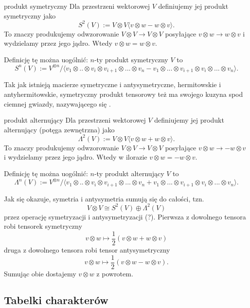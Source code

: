 \begin{definition}{produkt symetryczny}{}
  Dla przestrzeni wektorowej $V$ definiujemy jej produkt symetryczny jako
  $$S^2(V):=V\otimes V\langle v\otimes w-w\otimes v\rangle.$$
  To znaczy produkujemy odwzorowanie $V\otimes V\to V\otimes V$ posyłające $v\otimes w\to w\otimes v$ i wydzielamy przez jego jądro. Wtedy $v\otimes w=w\otimes v$.
  \bigskip
  
  Definicję tę można uogólnić: $n$-ty produkt symetryczny $V$ to
  $$S^n(V):=V^{\otimes n}/\langle v_1\otimes..\otimes v_i\otimes v_{i+1}\otimes...\otimes v_n-v_1\otimes...\otimes v_{i+1}\otimes v_i\otimes ... \otimes v_n\rangle.$$
\end{definition}

Tak jak istnieją macierze symetryczne i antysymetryczne, hermitowskie i antyhermitowskie, symetryczny produkt tensorowy też ma swojego kuzyna spod ciemnej gwiazdy, nazywającego się .

\begin{definition}{produkt alternujący}{}
  Dla przestrzeni wektorowej $V$ definiujemy jej produkt alternujący (potęga zewnętrzna) jako
  $$\Lambda^2(V):=V\otimes V\langle v\otimes w+w\otimes v\rangle.$$
  To znaczy produkujemy odwzorowanie $V\otimes V\to V\otimes V$ posyłające $v\otimes w\to -w\otimes v$ i wydzielamy przez jego jądro. Wtedy w ilorazie $v\otimes w=-w\otimes v$.
  \bigskip
  
  Definicję tę można uogólnić: $n$-ty produkt alternujący $V$ to
  $$\Lambda^n(V):=V^{\otimes n}/\langle v_1\otimes..\otimes v_i\otimes v_{i+1}\otimes...\otimes v_n+v_1\otimes...\otimes v_{i+1}\otimes v_i\otimes ... \otimes v_n\rangle.$$
\end{definition}

Jak się okazuje, symetria i antysymetria sumują się do całości, tzn.
$$V\otimes V\cong S^2(V)\oplus \Lambda^2(V)$$
przez operację symetryzacji i antysymetryzacji (?). Pierwsza z dowolnego tensora robi tensorek symetryczny
$$v\otimes w\mapsto\frac{1}{2}(v\otimes w+w\otimes v)$$
druga z dowolnego tensora robi tensor antysymetryczny
$$v\otimes w\mapsto\frac{1}{2}(v\otimes w-w\otimes v).$$
Sumując obie dostajemy $v\otimes w$ z powrotem.





\subsection{Tabelki charakterów}


